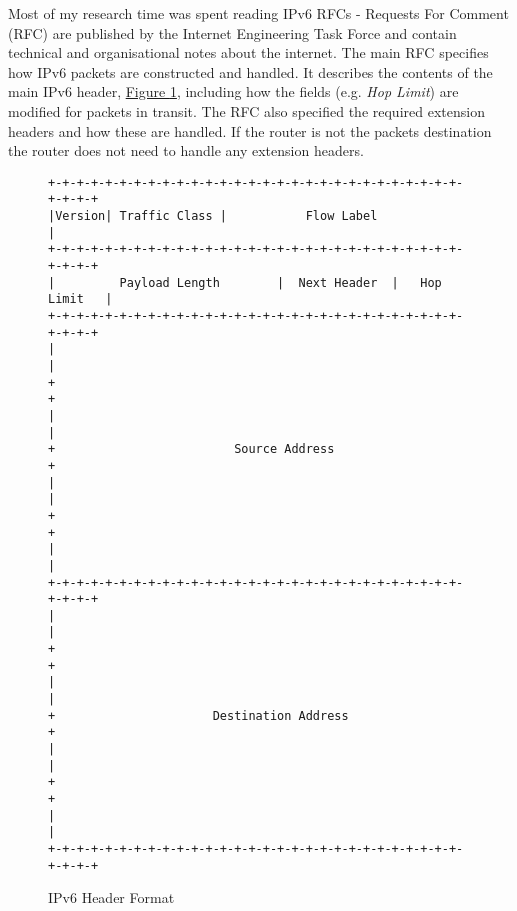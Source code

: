 \documentclass[12pt,a4paper,twoside,openany]{report}
\begin{document}
\bigskip

Most of my research time was spent reading IPv6 RFCs - Requests For Comment (RFC) are published by the Internet Engineering Task Force and contain technical and organisational notes about the internet\cite{what_rfc}.  The main RFC\cite{ipv6_rfc} specifies how IPv6 packets are constructed and handled. It describes the contents of the main IPv6 header, \hyperref[fig::ipv6_header]{Figure }\ref{fig::ipv6_header}, including how the fields (e.g. \textit{Hop Limit}) are modified for packets in transit. The RFC also specified the required extension headers and how these are handled. If the router is not the packets destination the router does not need to handle any extension headers.

\begin{figure}
\centering
\begin{varwidth}{\linewidth}
\begin{verbatim}
+-+-+-+-+-+-+-+-+-+-+-+-+-+-+-+-+-+-+-+-+-+-+-+-+-+-+-+-+-+-+-+-+
|Version| Traffic Class |           Flow Label                  |
+-+-+-+-+-+-+-+-+-+-+-+-+-+-+-+-+-+-+-+-+-+-+-+-+-+-+-+-+-+-+-+-+
|         Payload Length        |  Next Header  |   Hop Limit   |
+-+-+-+-+-+-+-+-+-+-+-+-+-+-+-+-+-+-+-+-+-+-+-+-+-+-+-+-+-+-+-+-+
|                                                               |
+                                                               +
|                                                               |
+                         Source Address                        +
|                                                               |
+                                                               +
|                                                               |
+-+-+-+-+-+-+-+-+-+-+-+-+-+-+-+-+-+-+-+-+-+-+-+-+-+-+-+-+-+-+-+-+
|                                                               |
+                                                               +
|                                                               |
+                      Destination Address                      +
|                                                               |
+                                                               +
|                                                               |
+-+-+-+-+-+-+-+-+-+-+-+-+-+-+-+-+-+-+-+-+-+-+-+-+-+-+-+-+-+-+-+-+
\end{verbatim}
\end{varwidth}
\caption{IPv6 Header Format\cite{ipv6_rfc}}
\label{fig::ipv6_header}
\end{figure}
\end{document}
